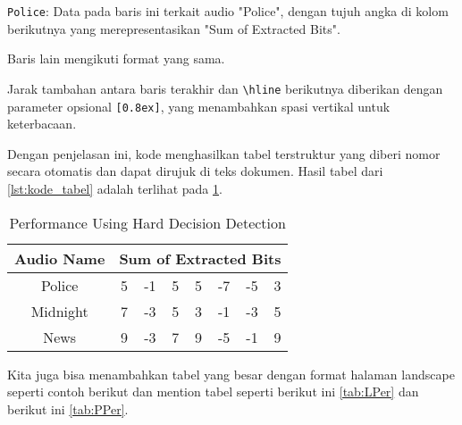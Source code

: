 \begin{packed_enum}
        \begin{packed_enum}
            \item \texttt{Police}: Data pada baris ini terkait audio "Police", dengan tujuh angka di kolom berikutnya yang merepresentasikan "Sum of Extracted Bits".
            \item Baris lain mengikuti format yang sama.
        \end{packed_enum}
    \item Jarak tambahan antara baris terakhir dan \texttt{\textbackslash hline} berikutnya diberikan dengan parameter opsional \texttt{[0.8ex]}, yang menambahkan spasi vertikal untuk keterbacaan.
\end{packed_enum}

Dengan penjelasan ini, kode menghasilkan tabel terstruktur yang diberi nomor secara otomatis dan dapat dirujuk di teks dokumen. Hasil tabel dari \cref{lst:kode_tabel} adalah terlihat pada \cref{tab:hresult}.

\begin{table}[h]
    \caption{Performance Using Hard Decision Detection}
    \label{tab:hresult}
    \centering
    \begin{tabular}{c rrrrrrr}
        \hline\hline
        Audio Name&\multicolumn{7}{c}{Sum of Extracted Bits} \\ [0.5ex] 
        \hline
        Police & 5 & -1 & 5& 5& -7& -5& 3\\
        Midnight & 7 & -3 & 5& 3& -1& -3& 5\\
        News & 9 & -3 & 7& 9& -5& -1& 9\\[0.8ex]
        \hline
    \end{tabular}
\end{table}

Kita juga bisa menambahkan tabel yang besar dengan format halaman landscape seperti contoh berikut dan mention tabel seperti berikut ini \cref{tab:LPer} dan berikut ini \cref{tab:PPer}.

